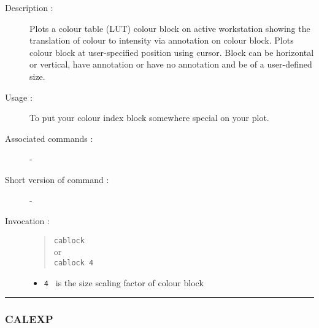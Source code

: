 \begin{description}

\item[Description :] Plots a colour table (LUT) colour block on active
workstation showing the translation of colour to intensity via annotation
on colour block.  Plots colour block at user-specified position using
cursor. Block can be horizontal or vertical, have annotation or have no
annotation and be of a user-defined size.

\item[Usage :] To put your colour index block somewhere special on your plot.

\item[Associated commands :] -
\item[Short version of command :] -
\item[Invocation :]

\begin{quote}{\tt  cablock }\\
or \\
{\tt  cablock 4 }
\end{quote}

\begin{itemize}

\item {\tt 4 } is the size scaling factor of colour block

\end{itemize}
\end{description}

\hrule
\subsubsection*{\label{CALEXP}CALEXP}

